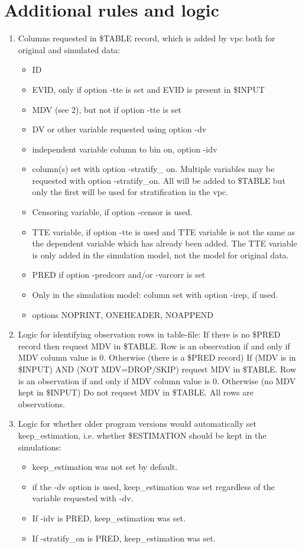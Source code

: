 \section{Additional rules and logic}

\begin{enumerate}
	\item Columns requested in \$TABLE record, which is added by vpc both for original and simulated data:
	\begin{itemize}
		\item ID
		\item EVID, only if option -tte is set and EVID is present in \$INPUT
		\item MDV (see 2), but not if option -tte is set
		\item DV or other variable requested using option -dv
		\item independent variable column to bin on, option -idv
		\item column(s) set with option  -stratify\_ on. Multiple variables may be requested with option -stratify\_on. All will be added to \$TABLE but only the first will be used for stratification in the vpc.
		\item Censoring variable, if option -censor is used.
		\item TTE variable, if option -tte is used and TTE variable is not the same as the dependent variable which has already been added. The TTE variable is only added in the simulation model, not the model for original data.
        \item PRED if option -predcorr and/or -varcorr is set
        \item Only in the simulation model: column set with option -irep, if used.
		\item options NOPRINT, ONEHEADER, NOAPPEND
	\end{itemize}
	\item Logic for identifying observation rows  in table-file:
If there is no \$PRED record
	then request MDV in \$TABLE. Row is an observation if and only if MDV column value is 0.
Otherwise (there is a \$PRED record)
	If (MDV is in \$INPUT) AND (NOT MDV=DROP/SKIP)
		request MDV in \$TABLE. Row is an observation if and only if MDV column value is 0.
	Otherwise (no MDV kept in \$INPUT)
		Do not request MDV in \$TABLE. All rows are observations.
	\item Logic for whether older program versions would automatically set keep\_estimation, i.e. whether \$ESTIMATION should be kept in the simulations:
	\begin{itemize}
		\item keep\_estimation was not set by default.
		\item if the -dv option is used, keep\_estimation was set regardless of the variable requested with -dv.
		\item If -idv is PRED, keep\_estimation was set.
		\item If -stratify\_on is PRED, keep\_estimation was set.
	\end{itemize}
\end{enumerate}

